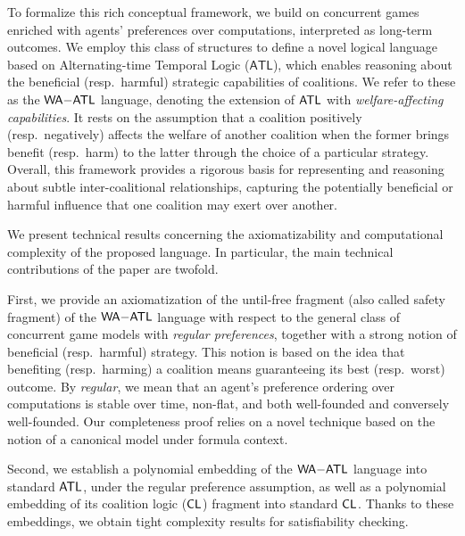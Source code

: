 \documentclass{article}
\begin{document}
To formalize this rich conceptual framework, we build on concurrent games enriched with agents' preferences over computations, interpreted as long-term outcomes.  
We employ this class of structures to define a novel logical language based
on Alternating-time Temporal Logic ($\mathsf{ATL}$), which enables  reasoning about the  beneficial (resp.\ harmful) strategic capabilities of coalitions. 
We refer to these as the $\mathsf{WA{-}ATL}$ language, denoting 
the extension of $\mathsf{ATL}$ with \emph{welfare-affecting capabilities}.
It rests on the assumption that a coalition positively (resp.\ negatively) affects 
the welfare of  another coalition when the former brings benefit (resp.\ harm) to the latter through the choice of a particular strategy. 
Overall, this framework provides a rigorous basis for representing and reasoning about subtle inter-coalitional relationships, capturing the potentially beneficial or harmful influence that one coalition may exert over another.


We present  technical results concerning the axiomatizability and computational complexity of the proposed language.  
In particular, the main 
technical contributions of the paper are twofold.  

First, we provide an axiomatization of the until-free  fragment
(also called safety fragment) of the $\mathsf{WA{-}ATL}$ language with respect to the general class of concurrent game models with \emph{regular preferences}, together with a strong notion of beneficial (resp.\ harmful) strategy. This notion is based on the idea that benefiting (resp.\ harming) a coalition means guaranteeing its best (resp.\ worst) outcome. By \emph{regular}, we mean that an agent's preference ordering 
over computations 
is stable over time, non-flat, and both well-founded and conversely well-founded. Our completeness proof relies on a novel technique based on the notion of a canonical model under formula context.


Second, we establish a polynomial embedding of the $\mathsf{WA{-}ATL}$ language into standard $\mathsf{ATL}$, under the regular preference assumption, as well as a polynomial embedding  of 
its coalition logic ($\mathsf{CL} $)
fragment into standard $\mathsf{CL} $. Thanks to these embeddings, we obtain tight complexity results for satisfiability checking.
\end{document}
